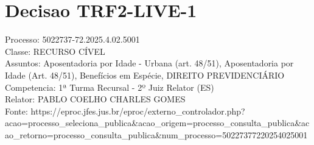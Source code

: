 \documentclass[12pt]{article}
\begin{document}
\section*{Decisao TRF2-LIVE-1}
Processo: 5022737-72.2025.4.02.5001\\
Classe: RECURSO CÍVEL\\
Assuntos: Aposentadoria por Idade - Urbana (art. 48/51), Aposentadoria por Idade (Art. 48/51), Benefícios em Espécie, DIREITO PREVIDENCIÁRIO\\
Competencia: 1ª Turma Recursal - 2º Juiz Relator (ES)\\
Relator: PABLO COELHO CHARLES GOMES\\
Fonte: https://eproc.jfes.jus.br/eproc/externo\_controlador.php?acao=processo\_seleciona\_publica\&acao\_origem=processo\_consulta\_publica\&acao\_retorno=processo\_consulta\_publica\&num\_processo=50227377220254025001
\end{document}
